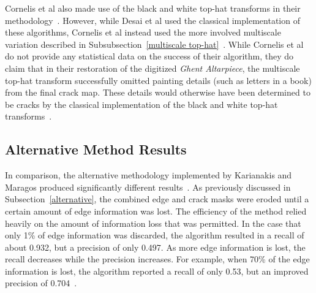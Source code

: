 \documentclass{sig-alternate}
\begin{document}
Cornelis et al also made use of the black and white top-hat transforms in their methodology~\cite{Altarpiece:2013}. However, while Desai et al used the classical implementation of these algorithms, Cornelis et al instead used the more involved multiscale variation described in Subsubsection~\ref{multiscale top-hat}~\cite{Altarpiece:2013, Statistics:2013}. While Cornelis et al do not provide any statistical data on the success of their algorithm, they do claim that in their restoration of the digitized \textit{Ghent Altarpiece}, the multiscale top-hat transform successfully omitted painting details (such as letters in a book) from the final crack map. These details would otherwise have been determined to be cracks by the classical implementation of the black and white top-hat transforms~\cite{Altarpiece:2013}.

\subsection{Alternative Method Results}\label{alternative results}
In comparison, the alternative methodology implemented by Karianakis and Maragos produced significantly different results~\cite{Theran:2013}. As previously discussed in Subsection~\ref{alternative}, the combined edge and crack masks were eroded until a certain amount of edge information was lost. The efficiency of the method relied heavily on the amount of information loss that was permitted. In the case that only 1\% of edge information was discarded, the algorithm resulted in a recall of about 0.932, but a precision of only 0.497. As more edge information is lost, the recall decreases while the precision increases. For example, when 70\% of the edge information is lost, the algorithm reported a recall of only 0.53, but an improved precision of 0.704~\cite{Theran:2013}.
\end{document}
